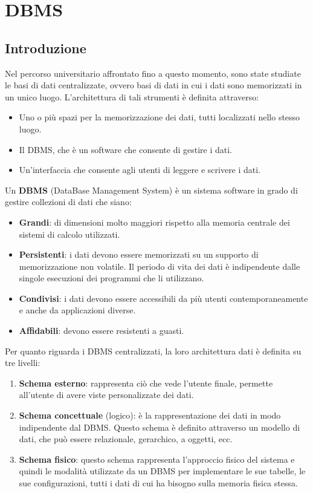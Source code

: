 \chapter{DBMS}
\section{Introduzione}
Nel percorso universitario affrontato fino a questo momento, sono state studiate
le basi di dati centralizzate, ovvero basi di dati in cui i dati sono memorizzati
in un unico luogo. L'architettura di tali strumenti è definita attraverso:
\begin{itemize}
      \item Uno o più spazi per la memorizzazione dei dati, tutti localizzati nello
            stesso luogo.
      \item Il DBMS, che è un software che consente di gestire i dati.
      \item Un'interfaccia che consente agli utenti di leggere e scrivere i dati.
\end{itemize}
\begin{definizione}
      Un \textbf{DBMS} (DataBase Management System) è un sistema software in grado
      di gestire collezioni di dati che siano:
      \begin{itemize}
            \item \textbf{Grandi}: di dimensioni molto maggiori rispetto alla memoria
                  centrale dei sistemi di calcolo utilizzati.
            \item \textbf{Persistenti}: i dati devono essere memorizzati su un
                  supporto di memorizzazione non volatile. Il periodo di vita dei
                  dati è indipendente dalle singole esecuzioni dei programmi che li
                  utilizzano.
            \item \textbf{Condivisi}: i dati devono essere accessibili da più utenti
                  contemporaneamente e anche da applicazioni diverse.
            \item \textbf{Affidabili}: devono essere resistenti a guasti.
      \end{itemize}
\end{definizione}
Per quanto riguarda i DBMS centralizzati, la loro architettura dati è definita
su tre livelli:
\begin{enumerate}
      \item \textbf{Schema esterno}: rappresenta ciò che vede l'utente finale,
            permette all'utente di avere viste personalizzate dei dati.
      \item \textbf{Schema concettuale} (logico): è la rappresentazione dei dati in modo
            indipendente dal DBMS. Questo schema è definito attraverso un modello
            di dati, che può essere relazionale, gerarchico, a oggetti, ecc.
      \item \textbf{Schema fisico}: questo schema rappresenta l'approccio fisico
            del sistema e quindi le modalità utilizzate da un DBMS per implementare
            le sue tabelle, le sue configurazioni, tutti i dati di cui ha bisogno
            sulla memoria fisica stessa.
\end{enumerate}
